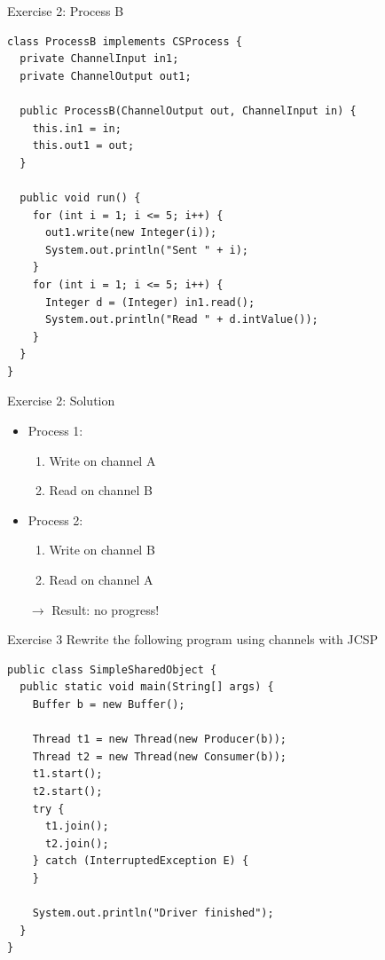 \begin{frame}[fragile]{Exercise 2: Process B}
\begin{lstlisting}[basicstyle=\fontsize{9}{11}\selectfont\ttfamily]
class ProcessB implements CSProcess {
  private ChannelInput in1;
  private ChannelOutput out1;

  public ProcessB(ChannelOutput out, ChannelInput in) {
    this.in1 = in;
    this.out1 = out;
  }

  public void run() {
    for (int i = 1; i <= 5; i++) {
      out1.write(new Integer(i));
      System.out.println("Sent " + i);
    }
    for (int i = 1; i <= 5; i++) {
      Integer d = (Integer) in1.read();
      System.out.println("Read " + d.intValue());
    }
  }
}
\end{lstlisting}
\end{frame}

\begin{frame}{Exercise 2: Solution}
  \begin{itemize}
  \item Process 1:
    \begin{enumerate}
    \item Write on channel A
    \item Read on channel B
    \end{enumerate}
  \item Process 2:
    \begin{enumerate}
    \item Write on channel B
    \item Read on channel A
    \end{enumerate}
  \item[$\rightarrow$] Result: no progress!
  \end{itemize}
\end{frame}

\begin{frame}[fragile]{Exercise 3}
  Rewrite the following program using channels with JCSP


\begin{lstlisting}[basicstyle=\fontsize{9}{11}\selectfont\ttfamily]
public class SimpleSharedObject {
  public static void main(String[] args) {
    Buffer b = new Buffer();

    Thread t1 = new Thread(new Producer(b));
    Thread t2 = new Thread(new Consumer(b));
    t1.start();
    t2.start();
    try {
      t1.join();
      t2.join();
    } catch (InterruptedException E) {
    }

    System.out.println("Driver finished");
  }
}
\end{lstlisting}
\end{frame}


